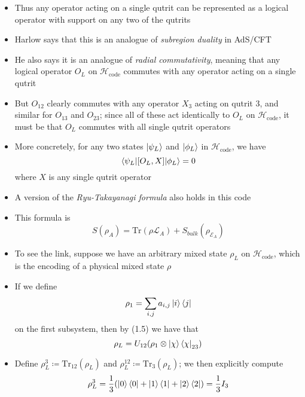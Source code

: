 \documentclass[12pt,a4paper]{article}
\numberwithin{equation}{section}
\newcommand{\ketbra}[2]{\ket{#1}\bra{#2}}
\newcommand{\ketbras}[1]{\ketbra{#1}{#1}}
\begin{document}
\begin{itemize}
		\item Thus any operator acting on a single qutrit can be represented as a logical operator with support on any two of the qutrits
		\item Harlow says that this is an analogue of \textit{subregion duality} in AdS/CFT
		\item He also says it is an analogue of \textit{radial commutativity}, meaning that any logical operator $O_{L}$ on $\mathcal{H}_{\text{code}}$ commutes with any operator acting on a single qutrit
		\item But $O_{12}$ clearly commutes with any operator $X_{3}$ acting on qutrit 3, and similar for $O_{13}$ and $O_{23}$; since all of these act identically to $O_{L}$ on $\mathcal{H}_{\text{code}}$, it must be that $O_{L}$ commutes with all single qutrit operators
		\item More concretely, for any two states $\ket{\psi_{L}}$ and $\ket{\phi_{L}}$ in $\mathcal{H}_{\text{code}}$, we have
		\begin{equation}
			\braket{\psi_{L}|[O_{L},X]|\phi_{L}}=0
		\end{equation}
		where $X$ is any single qutrit operator
		\item A version of the \textit{Ryu-Takayanagi formula} also holds in this code
		\item This formula is
		\begin{equation}
			S(\rho_{A})=\text{Tr}(\rho\mathcal{L}_{A})+S_{bulk}(\rho_{\mathcal{E}_{A}})
		\end{equation}
		\item To see the link, suppose we have an arbitrary mixed state $\rho_{L}$ on $\mathcal{H}_{\text{code}}$, which is the encoding of a physical mixed state $\rho$
		\item If we define 
		\begin{equation}
			\rho_{1}=\sum_{i,j}a_{i,j}\ketbra{i}{j}
		\end{equation}
		on the first subsystem, then by (1.5) we have that
		\begin{equation}
			\rho_{L}=U_{12}(\rho_{1}\otimes\ketbras{\chi}_{23})
		\end{equation}
		\item Define $\rho_{L}^{3}\coloneqq\text{Tr}_{12}(\rho_{L})$ and $\rho_{L}^{12}\coloneqq\text{Tr}_{3}(\rho_{L})$; we then explicitly compute
		\begin{equation}
			\begin{aligned}
				\rho_{L}^{3}&=\frac{1}{3}(\ketbras{0}+\ketbras{1}+\ketbras{2})=\frac{1}{3}I_{3}\\

\end{aligned}
\end{equation}
\end{itemize}
\end{document}
